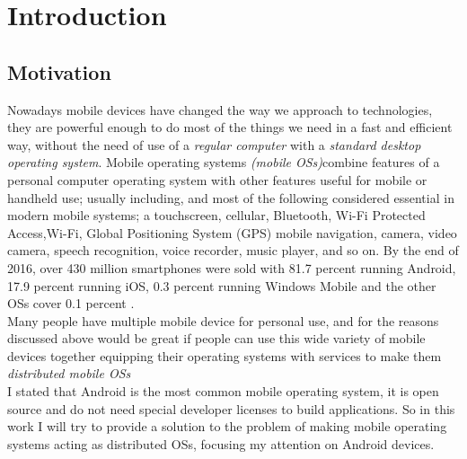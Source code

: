 %
%
\cleardoublepage
%
%
\chapter{Introduction}
%
%
\label{cap:introduction}
%
%

\section{Motivation}\label{motivation}
\par Nowadays mobile devices have changed the way we approach to technologies, they are powerful enough to do most of the things we need in a fast and efficient way, without the need of use of a \textit{regular computer} with a \textit{standard desktop operating system}. Mobile operating systems \textit{(mobile OSs)}combine features of a personal computer operating system with other features useful for mobile or handheld use; usually including, and most of the following considered essential in modern mobile systems; a touchscreen, cellular, Bluetooth, Wi-Fi Protected Access,Wi-Fi, Global Positioning System (GPS) mobile navigation, camera, video camera, speech recognition, voice recorder, music player, and so on. By the end of 2016, over 430 million smartphones were sold with 81.7 percent running Android, 17.9 percent running iOS, 0.3 percent running Windows Mobile and the other OSs cover 0.1 percent \cite{james2017percent}.\\
Many people have multiple mobile device for personal use, and for the reasons discussed above would be great if people can use this wide variety of mobile devices together equipping their operating systems with services to make them \textit{distributed mobile OSs}\\
 I stated that Android is the most common mobile operating system, it is open source and do not need special developer licenses to build applications. So in this work I will try to provide a solution to the problem of making mobile operating systems acting as distributed OSs, focusing my attention on Android devices. 
